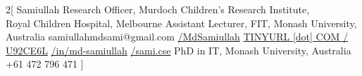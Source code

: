 \begin{multicols}{2}[
        {Samiullah}
        {Research Officer, Murdoch Children's Research Institute,\\\hspace{12pt} Royal Children Hospital, Melbourne}
        {Assistant Lecturer, FIT, Monash University, Australia}
        {samiullahmdsami@gmail.com}
        {\href{https://github.com/MdSamiullah}{/MdSamiullah}}
        {\href{https://tinyurl.com/u92ce6l}{TINYURL [dot] COM / U92CE6L}}
        {\href{https://linkedin.com/in/md-samiullah}{{/in/md-samiullah}}}
        {\href{https://fb.com/sami.cse}{/sami.cse}}
        {PhD in IT, Monash University, Australia}
        {+61 472 796 471}
]
\end{multicols}